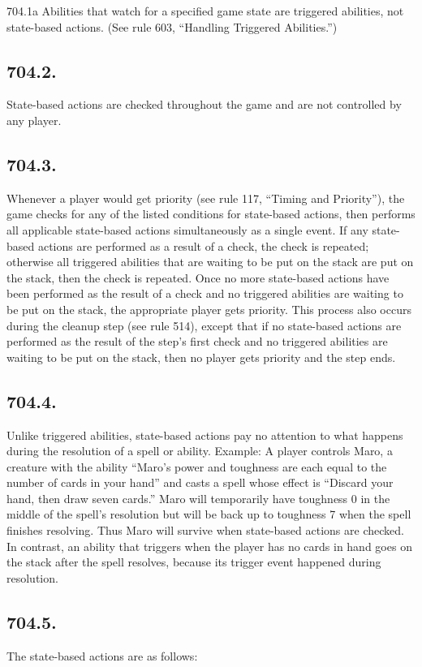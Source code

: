 704.1a Abilities that watch for a specified game state are triggered abilities, not state-based actions. (See rule 603, “Handling Triggered Abilities.”)

\subsection*{704.2.}
State-based actions are checked throughout the game and are not controlled by any player.

\subsection*{704.3.}
Whenever a player would get priority (see rule 117, “Timing and Priority”), the game checks for any of the listed conditions for state-based actions, then performs all applicable state-based actions simultaneously as a single event. If any state-based actions are performed as a result of a check, the check is repeated; otherwise all triggered abilities that are waiting to be put on the stack are put on the stack, then the check is repeated. Once no more state-based actions have been performed as the result of a check and no triggered abilities are waiting to be put on the stack, the appropriate player gets priority. This process also occurs during the cleanup step (see rule 514), except that if no state-based actions are performed as the result of the step’s first check and no triggered abilities are waiting to be put on the stack, then no player gets priority and the step ends.

\subsection*{704.4.}
Unlike triggered abilities, state-based actions pay no attention to what happens during the resolution of a spell or ability.
Example: A player controls Maro, a creature with the ability “Maro’s power and toughness are each equal to the number of cards in your hand” and casts a spell whose effect is “Discard your hand, then draw seven cards.” Maro will temporarily have toughness 0 in the middle of the spell’s resolution but will be back up to toughness 7 when the spell finishes resolving. Thus Maro will survive when state-based actions are checked. In contrast, an ability that triggers when the player has no cards in hand goes on the stack after the spell resolves, because its trigger event happened during resolution.

\subsection*{704.5.}
The state-based actions are as follows:

